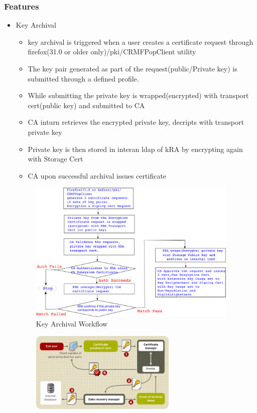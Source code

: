 \documentclass[a4paper]{article}
\begin{document}
\subsubsection{Features}
\begin{itemize}
    \item Key Archival
        \begin{itemize}
            \item key archival is triggered when a user creates a certificate request through
                firefox(31.0 or older only)/pki/CRMFPopClient utility
            \item The key pair generated as part of the request(public/Private key) is submitted
                through a defined profile. 
            \item While submitting the private key is wrapped(encrypted) with transport cert(public key)
                and submitted to CA
            \item CA inturn retrieves the encrypted private key, decripts with transport private key 
            \item Private key is then stored in interan ldap of kRA by encrypting again with Storage Cert
            \item CA upon successful archival issues certificate
        \end{itemize}
        \begin{figure}[H]
            \centering
            \includegraphics[width=100mm]{key-archival2.png}
            \caption{Key Archival Workflow}
        \end{figure}
        \begin{figure}[H]
            \centering
            \includegraphics[width=70mm]{key-archival-process.png}

\end{figure}
\end{itemize}
\end{document}
